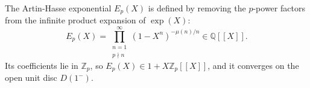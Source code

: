 The Artin-Hasse exponential $E_p(X)$ is defined by removing the $p$-power factors from the infinite product expansion of $\exp(X)$: $$E_p(X) = \prod_{\substack{n=1 \\ p \nmid n}}^\infty (1 - X^n)^{-\mu(n)/n} \in \mathbb{Q}[[X]].$$ Its coefficients lie in $\mathbb{Z}_p$, so $E_p(X) \in 1 + X\mathbb{Z}_p[[X]]$, and it converges on the open unit disc $D(1^-)$.